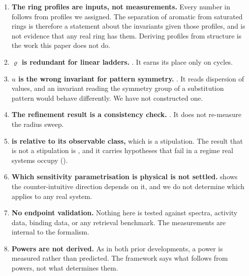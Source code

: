 \documentclass[11pt,a4paper]{article}
\theoremstyle{clthm}
\theoremstyle{definition}
\theoremstyle{remark}
\newcommand{\circu}{\varrho}
\newcommand{\unif}{u}
\begin{document}
\begin{enumerate}[label=\textbf{L\arabic*.},leftmargin=2.9em,itemsep=4pt]

\item \textbf{The ring profiles are inputs, not measurements.} Every
number in  follows from profiles we assigned. The
separation of aromatic from saturated rings is therefore a statement about
the invariants given those profiles, and is not evidence that any real
ring has them. Deriving profiles from structure is the work this paper
does not do.

\item \textbf{$\circu$ is redundant for linear ladders.}
. It earns its place only on cycles.

\item \textbf{$\unif$ is the wrong invariant for pattern symmetry.}
. It reads dispersion of values, and an invariant
reading the symmetry group of a substitution pattern would behave
differently. We have not constructed one.

\item \textbf{The refinement result is a consistency check.}
. It does not re-measure the radius sweep.

\item \textbf{ is relative to its observable class,}
which is a stipulation. The result that is not a stipulation is
, and it carries hypotheses that fail in a regime real
systems occupy ().

\item \textbf{Which sensitivity parametrisation is physical is not
settled.}  shows the counter-intuitive
direction depends on it, and we do not determine which applies to any real
system.

\item \textbf{No endpoint validation.} Nothing here is tested against
spectra, activity data, binding data, or any retrieval benchmark. The
measurements are internal to the formalism.

\item \textbf{Powers are not derived.} As in both prior developments, a
power is measured rather than predicted. The framework says what follows
from powers, not what determines them.
\end{enumerate}

\end{document}

